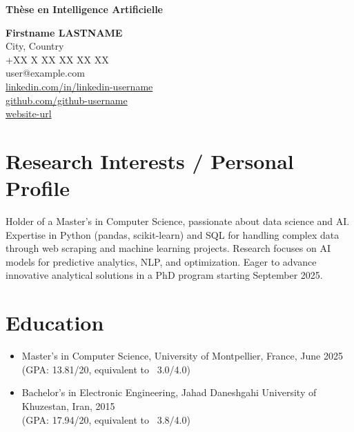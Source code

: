 \documentclass[11pt,a4paper]{article}
\makeatletter
\providecommand{\cvfirstname}{Firstname}
\providecommand{\cvlastname}{LASTNAME}
\providecommand{\cvemail}{user@example.com}
\providecommand{\cvphone}{+XX X XX XX XX XX}
\providecommand{\cvlocation}{City, Country}
\providecommand{\cvgithub}{github-username}
\providecommand{\cvlinkedin}{linkedin-username}
\providecommand{\cvwebsite}{website-url}
\makeatother
\begin{document}
\begin{center}
    \LARGE \textbf{Thèse en Intelligence Artificielle}
\end{center}

\begin{center}
  \textbf{\cvfirstname{} \cvlastname} \\
  \cvlocation \\
  \cvphone \\
  \cvemail \\
  \url{linkedin.com/in/\cvlinkedin} \\
  \url{github.com/\cvgithub} \\
  \url{\cvwebsite}
\end{center}

\section*{Research Interests / Personal Profile}
Holder of a Master's in Computer Science, passionate about data science and AI. Expertise in Python (pandas, scikit-learn) and SQL for handling complex data through web scraping and machine learning projects. Research focuses on AI models for predictive analytics, NLP, and optimization. Eager to advance innovative analytical solutions in a PhD program starting September 2025.

\section*{Education}
\begin{itemize}
  \item Master's in Computer Science, University of Montpellier, France, June 2025 \\(GPA: 13.81/20, equivalent to ~3.0/4.0)
  \item Bachelor's in Electronic Engineering, Jahad Daneshgahi University of Khuzestan, Iran, 2015 \\(GPA: 17.94/20, equivalent to ~3.8/4.0)
\end{itemize}
\end{document}
